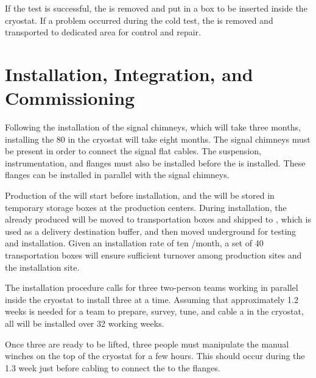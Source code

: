 If the test is successful, the  is removed and put in a box to be inserted inside the cryostat. If a problem occurred during the cold test, the  is removed and transported to dedicated area for control and repair. 

\section{Installation, Integration, and Commissioning}
\label{sec:dp-crp-install}
Following the installation of the signal chimneys, which will take three months, installing the \num{80}  in the cryostat will take eight  months. The signal chimneys must be present in order to 
connect the  signal flat cables. The suspension, instrumentation, and  flanges must also be  installed before the  is installed. These flanges can be installed in parallel with the signal chimneys. 

Production of the  will start before installation, and the  will be stored in temporary storage boxes at the production centers. During installation, the already produced  will be moved to transportation boxes and shipped to , which is used as a delivery destination buffer, and then  moved underground for testing and installation. Given an installation rate of ten /month, a set of \num{40} transportation boxes will ensure sufficient turnover among production sites and the installation site.

The installation procedure  calls for three two-person teams working in parallel inside the cryostat to install three  at a time. Assuming that 
approximately \num{1.2} weeks is needed for a team to prepare, survey, tune, and cable a  in the  cryostat, all \dptotcrp {} will be installed over \num{32} working weeks.

Once three  are ready to be lifted, three people must manipulate the manual winches on the top of the cryostat for a few hours. This should occur during the \num{1.3} week just before cabling to connect the  to the flanges. 


